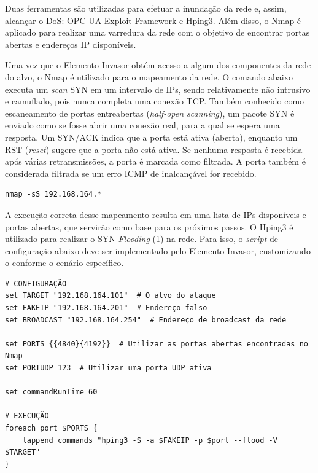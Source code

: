         Duas ferramentas são utilizadas para efetuar a inundação da rede e, assim, alcançar o DoS: OPC UA Exploit Framework e Hping3. Além disso, o Nmap é aplicado para realizar uma varredura da rede com o objetivo de encontrar portas abertas e endereços IP disponíveis.

        Uma vez que o Elemento Invasor obtém acesso a algum dos componentes da rede do alvo, o Nmap é utilizado para o mapeamento da rede. O comando abaixo executa um \textit{scan} SYN em um intervalo de IPs, sendo relativamente não intrusivo e camuflado, pois nunca completa uma conexão TCP. Também conhecido como escaneamento de portas entreabertas (\textit{half-open scanning}), um pacote SYN é enviado como se fosse abrir uma conexão real, para a qual se espera uma resposta. Um SYN/ACK indica que a porta está ativa (aberta), enquanto um RST (\textit{reset}) sugere que a porta não está ativa. Se nenhuma resposta é recebida após várias retransmissões, a porta é marcada como filtrada. A porta também é considerada filtrada se um erro ICMP de inalcançável for recebido.

        \begin{verbatim}
nmap -sS 192.168.164.*
        \end{verbatim}

        A execução correta desse mapeamento resulta em uma lista de IPs disponíveis e portas abertas, que servirão como base para os próximos passos. O Hping3 é utilizado para realizar o SYN \textit{Flooding} (1) na rede. Para isso, o \textit{script} de configuração abaixo deve ser implementado pelo Elemento Invasor, customizando-o conforme o cenário específico.

        \begin{verbatim}
# CONFIGURAÇÃO
set TARGET "192.168.164.101"  # O alvo do ataque
set FAKEIP "192.168.164.201"  # Endereço falso
set BROADCAST "192.168.164.254"  # Endereço de broadcast da rede

set PORTS {{4840}{4192}}  # Utilizar as portas abertas encontradas no Nmap
set PORTUDP 123  # Utilizar uma porta UDP ativa

set commandRunTime 60

# EXECUÇÃO
foreach port $PORTS {
    lappend commands "hping3 -S -a $FAKEIP -p $port --flood -V $TARGET"
}
        \end{verbatim}

